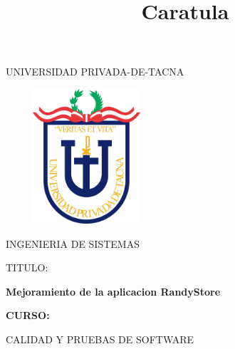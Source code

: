 \documentclass[12pt,letterpaper]{article}
\begin{document}
%


\title{Caratula}

\begin{titlepage}
\begin{center}
\large{UNIVERSIDAD PRIVADA-DE-TACNA}\\
\vspace*{-0.025in}
\begin{figure}[htb]
\begin{center}

\end{center}
\end{figure}
\begin{center}
    \includegraphics[width=6cm, height=5cm]{img/upt.jpg}  
\end{center}

\vspace*{0.15in}
INGENIERIA DE SISTEMAS  \\

\vspace*{0.5in}
\begin{large}
TITULO:\\
\end{large}

\vspace*{0.1in}
\begin{Large}
\textbf{Mejoramiento de la aplicacion RandyStore} \\
\end{Large}

\vspace*{0.3in}
\begin{Large}
\textbf{CURSO:} \\
\end{Large}

\vspace*{0.1in}
\begin{large}
CALIDAD Y PRUEBAS DE SOFTWARE\\
\end{large}


\end{center}
\end{titlepage}
\end{document}
